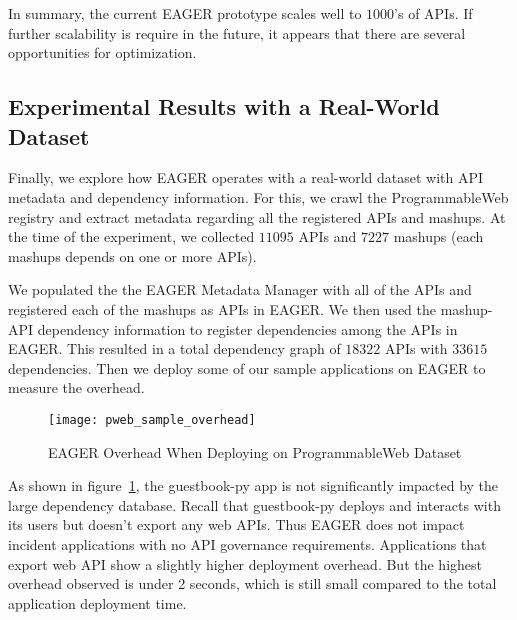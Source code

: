 In summary, the current EAGER prototype scales well to $1000$'s of APIs.
If further scalability is require in the future, it appears that there are
several opportunities for optimization.

\subsection{Experimental Results with a Real-World Dataset}

Finally, we explore how EAGER operates with a real-world dataset with API
metadata and dependency information. For this, we crawl the ProgrammableWeb
registry and extract metadata regarding all the registered APIs and mashups.
At the time of the experiment, we collected $11095$ APIs and $7227$ 
mashups (each mashups depends on one or more APIs).

We populated the the EAGER Metadata Manager with all of the APIs and
registered each of the mashups as APIs in EAGER. We then used the
mashup-API dependency information to register dependencies among the APIs in 
EAGER. This resulted in a 
total dependency graph of $18322$ APIs with $33615$ dependencies. 
Then we deploy
some of our sample applications on EAGER to measure the overhead.

\begin{figure}
\centering
\texttt{[image: pweb\_sample\_overhead]}
\caption{EAGER Overhead When Deploying on ProgrammableWeb Dataset}
\label{fig:pweb_sample_overhead}
\end{figure}

As shown in figure~\ref{fig:pweb_sample_overhead}, the guestbook-py app is not
significantly impacted by the large dependency database. 
Recall that 
guestbook-py deploys and interacts with its users but doesn't export any 
web APIs.  Thus EAGER does not impact incident applications with no API
governance requirements. 
Applications that export web API show a slightly higher deployment overhead. 
But the highest overhead observed is under 2 seconds, which is still small 
compared
to the total application deployment time. 

